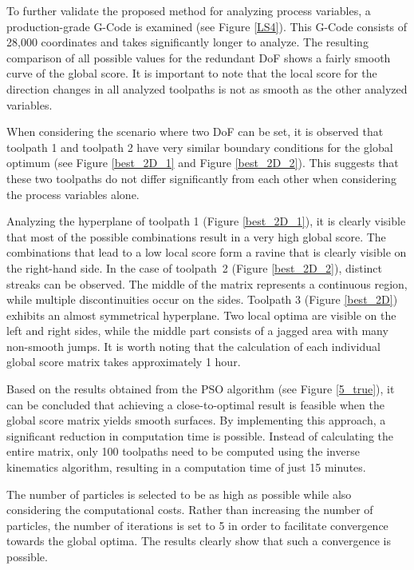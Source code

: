To further validate the proposed method for analyzing process variables, a production-grade G-Code is examined (see Figure \ref{LS4}). This G-Code consists of 28,000 coordinates and takes significantly longer to analyze. The resulting comparison of all possible values for the redundant \acrshort{DoF} shows a fairly smooth curve of the global score. It is important to note that the local score for the direction changes in all analyzed toolpaths is not as smooth as the other analyzed variables.


When considering the scenario where two \acrshort{DoF} can be set, it is observed that toolpath 1 and toolpath 2 have very similar boundary conditions for the global optimum (see Figure \ref{best_2D_1} and Figure \ref{best_2D_2}). This suggests that these two toolpaths do not differ significantly from each other when considering the process variables alone. 

Analyzing the hyperplane of toolpath 1 (Figure \ref{best_2D_1}), it is clearly visible that most of the possible combinations result in a very high global score. The combinations that lead to a low local score form a ravine that is clearly visible on the right-hand side. In the case of toolpath~2 (Figure \ref{best_2D_2}), distinct streaks can be observed. The middle of the matrix represents a continuous region, while multiple discontinuities occur on the sides. Toolpath 3 (Figure \ref{best_2D}) exhibits an almost symmetrical hyperplane. Two local optima are visible on the left and right sides, while the middle part consists of a jagged area with many non-smooth jumps. It is worth noting that the calculation of each individual global score matrix takes approximately 1 hour.


Based on the results obtained from the \acrshort{PSO} algorithm (see Figure \ref{5_true}), it can be concluded that achieving a close-to-optimal result is feasible when the global score matrix yields smooth surfaces. By implementing this approach, a significant reduction in computation time is possible. Instead of calculating the entire matrix, only 100 toolpaths need to be computed using the inverse kinematics algorithm, resulting in a computation time of just 15 minutes.

The number of particles is selected to be as high as possible while also considering the computational costs. Rather than increasing the number of particles, the number of iterations is set to 5 in order to facilitate convergence towards the global optima. The results clearly show that such a convergence is possible.


